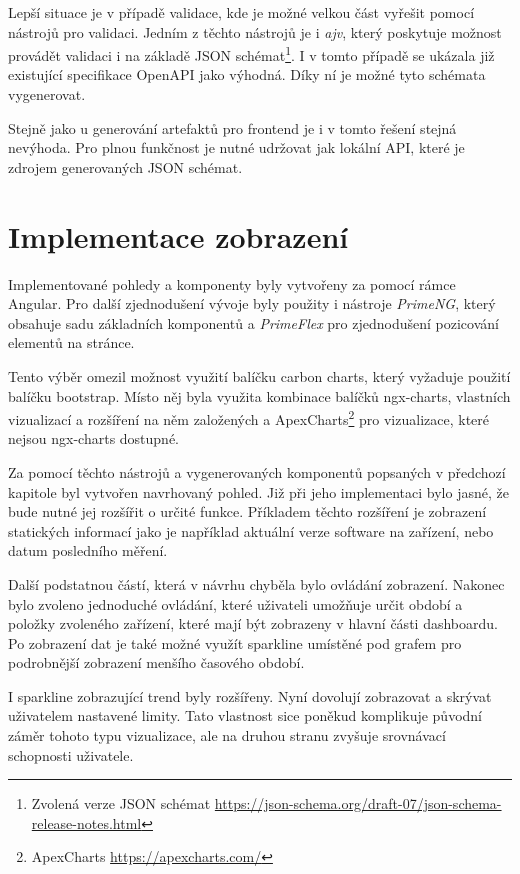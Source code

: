 Lepší situace je v případě validace, kde je možné velkou část vyřešit pomocí nástrojů pro validaci. Jedním z těchto nástrojů je i \emph{ajv}, který poskytuje možnost provádět validaci i na základě JSON schémat\footnote{Zvolená verze JSON schémat \url{https://json-schema.org/draft-07/json-schema-release-notes.html}}. I v tomto případě se ukázala již existující specifikace OpenAPI jako výhodná. Díky ní je možné tyto schémata vygenerovat.

Stejně jako u generování artefaktů pro frontend je i v tomto řešení stejná nevýhoda. Pro plnou funkčnost je nutné udržovat jak lokální API, které je zdrojem generovaných JSON schémat.

\section{Implementace zobrazení}
Implementované pohledy a komponenty byly vytvořeny za pomocí rámce Angular. Pro další zjednodušení vývoje byly použity i nástroje \emph{PrimeNG}, který obsahuje sadu základních komponentů a \emph{PrimeFlex} pro zjednodušení pozicování elementů na stránce.

Tento výběr omezil možnost využití balíčku carbon charts, který vyžaduje použití balíčku bootstrap. Místo něj byla využita kombinace balíčků ngx-charts, vlastních vizualizací a rozšíření na něm založených a ApexCharts\footnote{ApexCharts \url{https://apexcharts.com/}} pro vizualizace, které nejsou ngx-charts dostupné.

Za pomocí těchto nástrojů a vygenerovaných komponentů popsaných v předchozí kapitole byl vytvořen navrhovaný pohled. Již při jeho implementaci bylo jasné, že bude nutné jej rozšířit o určité funkce. Příkladem těchto rozšíření je zobrazení statických informací jako je například aktuální verze software na zařízení, nebo datum posledního měření.

Další podstatnou částí, která v návrhu chyběla bylo ovládání zobrazení. Nakonec bylo zvoleno jednoduché ovládání, které uživateli umožňuje určit období a položky zvoleného zařízení, které mají být zobrazeny v hlavní části dashboardu. Po zobrazení dat je také možné využít sparkline umístěné pod grafem pro podrobnější zobrazení menšího časového období. 

I sparkline zobrazující trend byly rozšířeny. Nyní dovolují zobrazovat a skrývat uživatelem nastavené limity. Tato vlastnost sice poněkud komplikuje původní záměr tohoto typu vizualizace, ale na druhou stranu zvyšuje srovnávací schopnosti uživatele.

